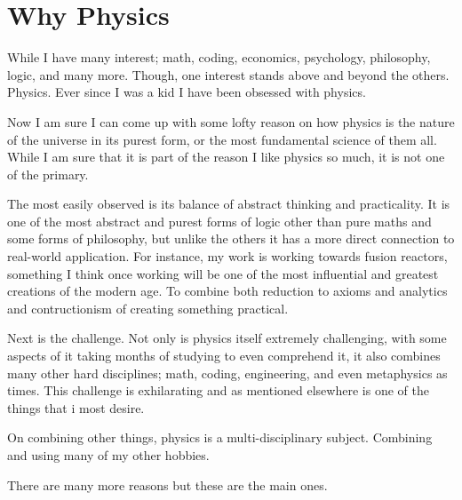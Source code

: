 \section{Why Physics}
\par While I have many interest; math, coding, economics, psychology, philosophy, logic, and many more. Though, one interest stands above and beyond the others. Physics. Ever since I was a kid I have been obsessed with physics.
\par Now I am sure I can come up with some lofty reason on how physics is the nature of the universe in its purest form, or the most fundamental science of them all. While I am sure that it is part of the reason I like physics so much, it is not one of the primary.
\par The most easily observed is its balance of abstract thinking and practicality. It is one of the most abstract and purest forms of logic other than pure maths and some forms of philosophy, but unlike the others it has a more direct connection to real-world application. For instance, my work is working towards fusion reactors, something I think once working will be one of the most influential and greatest creations of the modern age. To combine both reduction to axioms and analytics and contructionism of creating something practical.
\par Next is the challenge. Not only is physics itself extremely challenging, with some aspects of it taking months of studying to even comprehend it, it also combines many other hard disciplines; math, coding, engineering, and even metaphysics as times. This challenge is exhilarating and as mentioned elsewhere is one of the things that i most desire.
\par On combining other things, physics is a multi-disciplinary subject. Combining and using many of my other hobbies.

\par There are many more reasons but these are the main ones.
